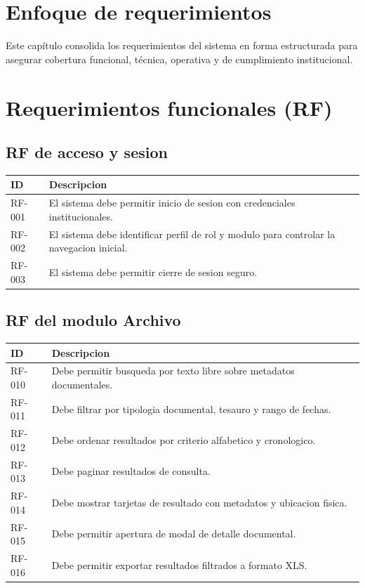 \section{Enfoque de requerimientos}
Este capítulo consolida los requerimientos del sistema en forma estructurada para asegurar cobertura funcional, técnica, operativa y de cumplimiento institucional.

\section{Requerimientos funcionales (RF)}
\subsection{RF de acceso y sesion}
\begin{longtable}{p{} p{}}
\toprule
\textbf{ID} & \textbf{Descripcion} \\
\midrule
RF-001 & El sistema debe permitir inicio de sesion con credenciales institucionales. \\
RF-002 & El sistema debe identificar perfil de rol y modulo para controlar la navegacion inicial. \\
RF-003 & El sistema debe permitir cierre de sesion seguro. \\
\bottomrule
\end{longtable}

\subsection{RF del modulo Archivo}
\begin{longtable}{p{} p{}}
\toprule
\textbf{ID} & \textbf{Descripcion} \\
\midrule
RF-010 & Debe permitir busqueda por texto libre sobre metadatos documentales. \\
RF-011 & Debe filtrar por tipologia documental, tesauro y rango de fechas. \\
RF-012 & Debe ordenar resultados por criterio alfabetico y cronologico. \\
RF-013 & Debe paginar resultados de consulta. \\
RF-014 & Debe mostrar tarjetas de resultado con metadatos y ubicacion fisica. \\
RF-015 & Debe permitir apertura de modal de detalle documental. \\
RF-016 & Debe permitir exportar resultados filtrados a formato XLS. \\
\bottomrule
\end{longtable}

